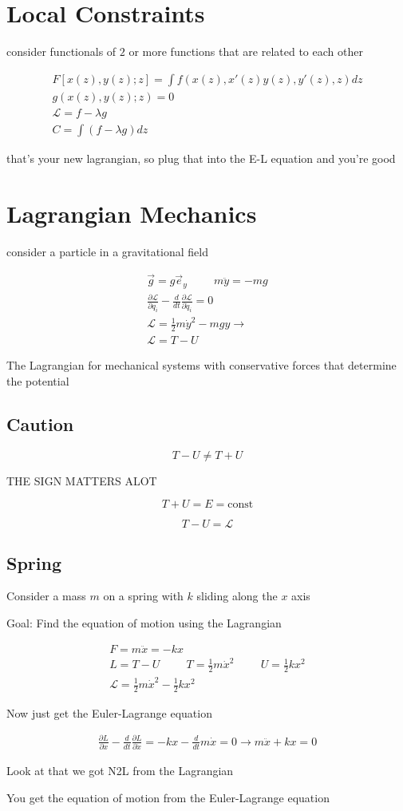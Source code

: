 \documentclass[fleqn]{report}
\newcommand{\hp}{\hspace{1cm}}
\newcommand{\const}{\textrm{const}}
\newcommand{\del}{\partial}
\newcommand{\equations} [1] {
\begin{gather*}
#1
\end{gather*}
}
\begin{document}
\section{Local Constraints}
consider functionals of $2$ or more functions that are related to each other 

\equations{
    F[x(z), y(z); z] = \int f(x(z), x'(z) y(z), y'(z), z) dz 
    \\
    g(x(z), y(z); z) = 0
    \\
    \mathcal L = f - \lambda g 
    \\
    C = \int (f - \lambda g) dz
}
that's your new lagrangian, so plug that into the E-L equation and you're good 

\section{Lagrangian Mechanics}
consider a particle in a gravitational field 
\equations{
    \vec g = g \vec e_y 
    \hp 
    m \ddot y = -mg 
    \\
    \frac{\del \mathcal L}{\del q_i}
    - 
    \frac{d}{dt}
    \frac{\del \mathcal L}{\del \dot q_i}
    = 0
    \\
    \mathcal L = \frac{1}{2} m \dot y^2 - mgy 
    \rightarrow 
    \\
    \mathcal L = T - U
}
The Lagrangian for mechanical systems with conservative forces that determine the potential 

\subsection{Caution}
\[T - U \neq T + U\]

THE SIGN MATTERS ALOT 

\[T + U = E = \const\]

\[
T - U = \mathcal L
\]

\subsection{Spring}
Consider a mass $m$ on a spring with $k$ sliding along the $x$ axis 

Goal: Find the equation of motion using the Lagrangian 
\equations{
    F = m \ddot x = - kx 
    \\
    L = T - U
    \hp 
    T = \frac{1}{2} m \dot x^2 
    \hp 
    U = \frac{1}{2} kx^2
    \\
    \mathcal L =  \frac{1}{2} m \dot x^2 
    - \frac{1}{2} kx^2
}
Now just get the Euler-Lagrange equation 
\equations{
    \frac{\del L}{\del x} - \frac{d}{dt} \frac{\del L}{\del \dot x}
    =
    -kx - \frac{d}{dt} m \dot x = 0
    \rightarrow 
    m \ddot x + kx = 0
}
Look at that we got N2L from the Lagrangian 

You get the equation of motion from the Euler-Lagrange equation 
\end{document}
